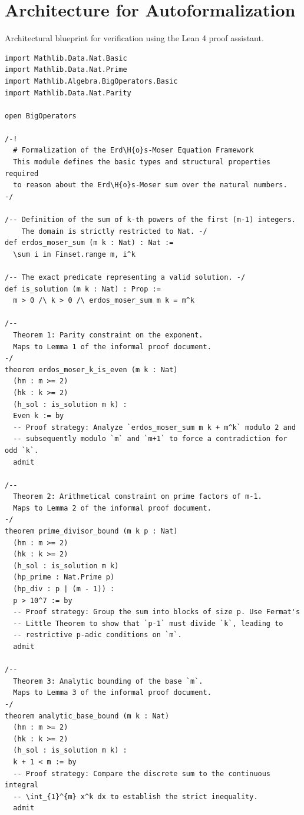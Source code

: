 \documentclass[11pt,a4paper]{article}
\begin{document}
\section{Architecture for Autoformalization}
Architectural blueprint for verification using the Lean 4 proof assistant.

\begin{lstlisting}
import Mathlib.Data.Nat.Basic
import Mathlib.Data.Nat.Prime
import Mathlib.Algebra.BigOperators.Basic
import Mathlib.Data.Nat.Parity

open BigOperators

/-!
  # Formalization of the Erd\H{o}s-Moser Equation Framework
  This module defines the basic types and structural properties required
  to reason about the Erd\H{o}s-Moser sum over the natural numbers.
-/

/-- Definition of the sum of k-th powers of the first (m-1) integers.
    The domain is strictly restricted to Nat. -/
def erdos_moser_sum (m k : Nat) : Nat :=
  \sum i in Finset.range m, i^k

/-- The exact predicate representing a valid solution. -/
def is_solution (m k : Nat) : Prop :=
  m > 0 /\ k > 0 /\ erdos_moser_sum m k = m^k

/--
  Theorem 1: Parity constraint on the exponent.
  Maps to Lemma 1 of the informal proof document.
-/
theorem erdos_moser_k_is_even (m k : Nat)
  (hm : m >= 2)
  (hk : k >= 2)
  (h_sol : is_solution m k) :
  Even k := by
  -- Proof strategy: Analyze `erdos_moser_sum m k + m^k` modulo 2 and
  -- subsequently modulo `m` and `m+1` to force a contradiction for odd `k`.
  admit

/--
  Theorem 2: Arithmetical constraint on prime factors of m-1.
  Maps to Lemma 2 of the informal proof document.
-/
theorem prime_divisor_bound (m k p : Nat)
  (hm : m >= 2)
  (hk : k >= 2)
  (h_sol : is_solution m k)
  (hp_prime : Nat.Prime p)
  (hp_div : p | (m - 1)) :
  p > 10^7 := by
  -- Proof strategy: Group the sum into blocks of size p. Use Fermat's
  -- Little Theorem to show that `p-1` must divide `k`, leading to
  -- restrictive p-adic conditions on `m`.
  admit

/--
  Theorem 3: Analytic bounding of the base `m`.
  Maps to Lemma 3 of the informal proof document.
-/
theorem analytic_base_bound (m k : Nat)
  (hm : m >= 2)
  (hk : k >= 2)
  (h_sol : is_solution m k) :
  k + 1 < m := by
  -- Proof strategy: Compare the discrete sum to the continuous integral
  -- \int_{1}^{m} x^k dx to establish the strict inequality.
  admit

\end{lstlisting}
\end{document}
